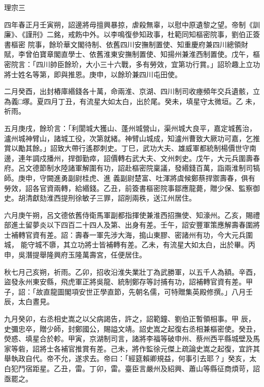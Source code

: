 
\begin{pinyinscope}

 理宗三



 四年春正月壬寅朔，詔邊將毋擅興暴掠，虐殺無辜，以慰中原遺黎之望。帝制《訓廉》、《謹刑》二銘，戒飭中外。以李鳴復參知政事，杜範同知樞密院事，劉伯正簽書樞密
 院事，餘玠華文閣待制、依舊四川安撫制置使、知重慶府兼四川總領財賦，李曾伯寶章閣直學士、依舊淮東安撫制置使、知揚州兼淮西制置使。戊午，樞密院言：「四川帥臣餘玠，大小三十六戰，多有勞效，宜第功行賞。」詔玠趣上立功將士姓名等第，即與推恩。庚申，以餘玠兼四川屯田使。



 二月癸酉，出封樁庫緡錢各十萬，命兩淮、京湖、四川制司收瘞頻年交兵遺骸，立為義□塚。夏四月丁丑，有流星大如太白，出於尾。癸未，填星守太微垣。乙
 未，祈雨。



 五月庚戌，餘玠言：「利閬城大獲山、蓬州城營山，渠州城大良平，嘉定城舊治，瀘州城神臂山，諸城工役，次第就緒。神臂山城成，知瀘州曹致大厥功可嘉，乞推賞以勵其餘。」詔致大帶行遙郡刺史。丁巳，武功大夫、雄威軍都統制楊價世守南邊，連年調戍播州，捍御勤瘁，詔價轉右武大夫、文州刺史。戊午，大元兵圍壽春府。呂文德節制水陸諸軍解圍有功，詔赴樞密院稟議，發緡錢百萬，詣兩淮制司犒師。庚申，守闕進勇副尉桂虎、進
 義副尉楚富、吐渾將虞候鄭蔡捍禦壽春，俱有勞效，詔各官資兩轉，給緡錢。乙丑，前簽書樞密院事鄒應龍薨，贈少保、監察御史。胡清獻劾淮西提刑徐敏子三罪，詔削兩秩，送江州居住。



 六月庚午朔，呂文德依舊侍衛馬軍副都指揮使兼淮西招撫使、知濠州。乙亥，賜禮部進土留夢炎以下四百二十四人及第、出身有差。壬午，詔安豐軍策應解壽春圍將士補轉官資有差。詔：壽春一軍先涉大海，搗山東膠、密諸州有功，今大元兵圍城，
 能守城不隳，其立功將士皆補轉有差。乙未，有流星大如太白，出於畢。丙申，吳潛提舉隆興府玉隆萬壽宮，任便居住。



 秋七月己亥朔，祈雨。乙卯，招收沿淮失業壯丁為武勝軍，以五千人為額。辛酉，盜發永州東安縣，飛虎軍正將吳龍、統制鄭存等討捕有功，詔補轉官資有差。甲子，詔：「故直龍圖閣項安世正學直節，先朝名儒，可特贈集英殿修撰。」八月壬辰，太白晝見。



 九月癸卯，右丞相史嵩之以父病謁告，許之，詔範鐘、劉伯正暫領相事。甲
 辰，史彌忠卒，贈少師，封鄭國公，賜謚文靖。詔史嵩之起復右丞相兼樞密使。癸丑，熒惑、填星合於軫。甲寅，京湖制司言，諸將李福等破申州、蔡州西平縣城壁及馬家等砦，詔將士各補官推賞有差。己未，將作監徐元傑上疏論史嵩之起復，宜許其舉執政自代。帝不允，遂求去。帝曰：「經筵賴卿規益，何事引去耶？」癸亥，太白犯鬥宿距星。乙丑，雷。丁卯，雷。臺臣言嚴州及紹興、蕭山等縣征商煩苛，詔亟罷之。




\end{pinyinscope}
